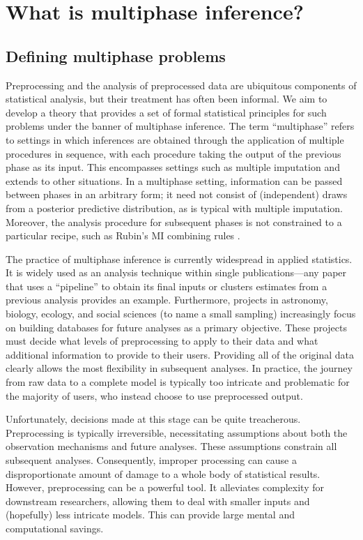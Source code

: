 \section{What is multiphase inference?}

\subsection{Defining multiphase problems}
Preprocessing and the analysis of preprocessed data are ubiquitous components of statistical analysis, but their treatment has often been informal.
We aim to develop a theory that provides a set of formal statistical principles for such problems under the banner of multiphase inference.
The term ``multiphase'' refers to settings in which inferences are obtained through the application of multiple procedures in sequence, with each procedure taking the output of the previous phase as its input.
This encompasses settings such as multiple imputation \citep[MI,][]{Rubin1987} and extends to other situations.
In a multiphase setting, information can be passed between phases in an arbitrary form; it need not consist of (independent) draws from a posterior predictive distribution, as is typical with multiple imputation.
Moreover, the analysis procedure for subsequent phases is not constrained to a particular recipe, such as Rubin's MI combining rules \citep{Rubin1987}.

The practice of multiphase inference is currently widespread in applied statistics.
It is widely used as an analysis technique within single publications---any paper that uses a ``pipeline'' to obtain its final inputs or clusters estimates from a previous analysis provides an example.
Furthermore, projects in astronomy, biology, ecology, and social sciences (to name a small sampling) increasingly focus on building databases for future analyses as a primary objective.
These projects must decide what levels of preprocessing to apply to their data and what additional information to provide to their users.
Providing all of the original data clearly allows the most flexibility in subsequent analyses.
In practice, the journey from raw data to a complete model is typically too intricate and problematic for the majority of users, who instead choose to use preprocessed output.

Unfortunately, decisions made at this stage can be  quite treacherous. Preprocessing is typically irreversible, necessitating assumptions about both the observation mechanisms and future analyses. These assumptions constrain all subsequent analyses.
Consequently, improper processing can cause a disproportionate amount of damage to a whole body of statistical results.
However, preprocessing can be a powerful tool.
It alleviates complexity for downstream researchers, allowing them to deal with smaller inputs and (hopefully) less intricate models.
This can provide large mental and computational savings.

